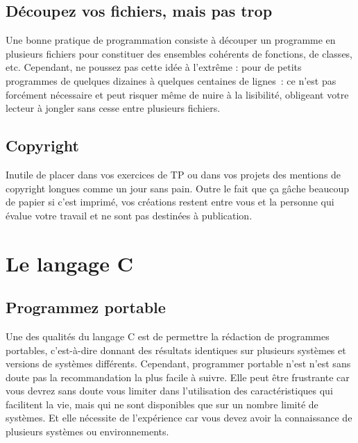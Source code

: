 \documentclass {article}
\begin{document}
\subsection {Découpez vos fichiers, mais pas trop}

Une bonne pratique de programmation consiste à découper un programme en
plusieurs fichiers pour constituer des ensembles cohérents de fonctions,
de classes, etc. Cependant, ne poussez pas cette idée à l'extrême :
pour de petits programmes de quelques dizaines à quelques centaines de
lignes~: ce n'est pas forcément nécessaire et peut risquer même de
nuire à la lisibilité, obligeant votre lecteur à jongler sans cesse
entre plusieurs fichiers.


\subsection {Copyright}

Inutile de placer dans vos exercices de TP ou dans vos projets des
mentions de copyright longues comme un jour sans pain. Outre le fait
que ça gâche beaucoup de papier si c'est imprimé, vos créations
restent entre vous et la personne qui évalue votre travail et ne sont
pas destinées à publication.


% 
% 


\section {Le langage C}

\subsection {Programmez portable}

Une des qualités du langage C est de permettre la rédaction de
programmes portables, c'est-à-dire donnant des résultats identiques
sur plusieurs systèmes et versions de systèmes différents. Cependant,
programmer portable n'est n'est sans doute pas la recommandation la plus
facile à suivre. Elle peut être frustrante car vous devrez sans doute
vous limiter dans l'utilisation des caractéristiques qui facilitent
la vie, mais qui ne sont disponibles que sur un nombre limité de
systèmes. Et elle nécessite de l'expérience car vous devez avoir la
connaissance de plusieurs systèmes ou environnements.
\end{document}
